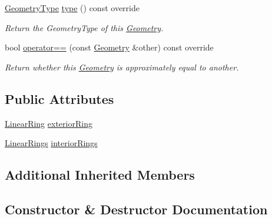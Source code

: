 \begin{DoxyCompactItemize}
\hyperlink{group___geometry_module_gad9a3ec0b998629dbcf8274512700964a}{Geometry\+Type} \hyperlink{structdg_1_1deepcore_1_1geometry_1_1_polygon_a776763aad39a6eb2bbac168dd003437e}{type} () const override
\begin{DoxyCompactList}\small\item\em Return the Geometry\+Type of this \hyperlink{structdg_1_1deepcore_1_1geometry_1_1_geometry}{Geometry}. \end{DoxyCompactList}\item 
bool \hyperlink{structdg_1_1deepcore_1_1geometry_1_1_polygon_a35ad2f74176358c7d92a20f1621579ba}{operator==} (const \hyperlink{structdg_1_1deepcore_1_1geometry_1_1_geometry}{Geometry} \&other) const override
\begin{DoxyCompactList}\small\item\em Return whether this \hyperlink{structdg_1_1deepcore_1_1geometry_1_1_geometry}{Geometry} is approximately equal to another. \end{DoxyCompactList}\end{DoxyCompactItemize}
\subsection*{Public Attributes}
\begin{DoxyCompactItemize}
\item 
\hyperlink{structdg_1_1deepcore_1_1geometry_1_1_linear_ring}{Linear\+Ring} \hyperlink{structdg_1_1deepcore_1_1geometry_1_1_polygon_a18bfbac81881cfd49eea638f21166c58}{exterior\+Ring}
\item 
\hyperlink{namespacedg_1_1deepcore_1_1geometry_a30a8b05e06c4718edc95c06f0958576d}{Linear\+Rings} \hyperlink{structdg_1_1deepcore_1_1geometry_1_1_polygon_a5590b4e7dc15b15ddd69ecea41914b9a}{interior\+Rings}
\end{DoxyCompactItemize}
\subsection*{Additional Inherited Members}


\subsection{Constructor \& Destructor Documentation}
